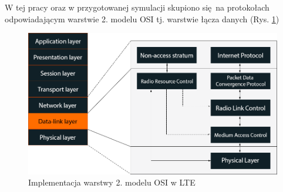 W tej pracy oraz w przygotowanej symulacji skupiono się na protokołach odpowiadającym warstwie 2. modelu OSI tj. warstwie łącza danych (Rys. \ref{fig:osi_to_lte})

\begin{figure}
	\centerline{\includegraphics[width=1.0\textwidth]{images/osi_to_lte.png}}
	\caption{Implementacja warstwy 2. modelu OSI w LTE}
	\label{fig:osi_to_lte}
\end{figure}